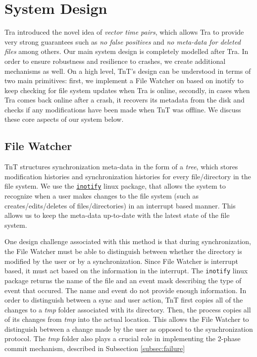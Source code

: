 \section{System Design}

Tra introduced the novel idea of {\em vector time pairs}, which allows Tra to provide very strong guarantees such as {\em no false positives} and {\em no meta-data for deleted files} among others. Our main system design is completely modelled after Tra.  In order to ensure robustness and resilience to crashes, we create additional mechanisms as well. On a high level, TnT's design can be understood in terms of two main primitives: first, we implement a File Watcher on based on inotify to keep checking for file system updates when Tra is online, secondly, in cases when Tra comes back online after a crash, it recovers its metadata from the disk and checks if any modifications have been made when TnT was offline.  We discuss these core aspects of our system below.

\subsection{File Watcher}
TnT structures synchronization meta-data in the form of a {\em tree}, which stores modification histories and synchronization histories for every file/directory in the file system. We use the \href{http://godoc.org/code.google.com/p/go.exp/inotify}{\tt inotify} linux package, that allows the system to recognize when a user makes changes to the file system (such as creates/edits/deletes of files/directories) in an interrupt based manner. This allows us to keep the meta-data up-to-date with the latest state of the file system.

One design challenge associated with this method is that during synchronization, the File Watcher must be able to distinguish between whether the directory is modified by the user or by a synchronization.  Since File Watcher is interrupt based, it must act based on the information in the interrupt.  The {\tt inotify} linux package returns the name of the file and an event mask describing the type of event that occured.  The name and event do not provide enough information.  In order to distinguish between a sync and user action, TnT first copies all of the changes to a {\em tmp} folder associated with its directory.  Then, the process copies all of its changes from {\em tmp} into the actual location. This allows the File Watcher to distinguish between a change made by the user as opposed to the synchronization protocol. The {\em tmp} folder also plays a crucial role in implementing the 2-phase commit mechanism, described in Subsection \ref{subsec:failure}

